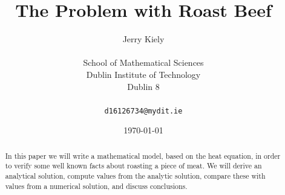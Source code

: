 \documentclass{report}
\begin{document}
\title{The Problem with Roast Beef}
\author{Jerry Kiely\\
  \\
  School of Mathematical Sciences\\
  Dublin Institute of Technology\\
  Dublin 8\\
  \\
  \texttt{d16126734@mydit.ie}}
\date{\today}
\maketitle







\tableofcontents







\begin{abstract}
In this paper we will write a mathematical model, based on the heat equation, 
in order to verify some well known facts about roasting a piece of meat. We 
will derive an analytical solution, compute values from the analytic solution, 
compare these with values from a numerical solution, and discuss conclusions.
\end{abstract}
\end{document}
